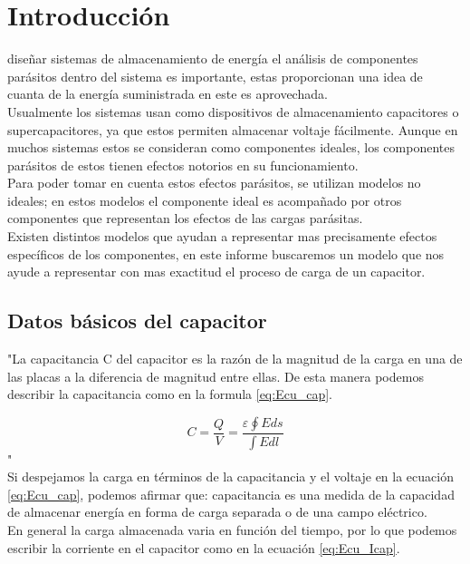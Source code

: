 \documentclass[journal]{IEEEtran}
\begin{document}
\section{Introducción}
% 
% 
% 
% 
 diseñar sistemas de almacenamiento de energía el análisis de componentes parásitos dentro del sistema es importante, estas proporcionan una idea de cuanta de la energía suministrada en este es aprovechada. \\
Usualmente los sistemas usan como dispositivos de almacenamiento capacitores o supercapacitores, ya que estos permiten almacenar voltaje fácilmente. Aunque en muchos sistemas estos se consideran como componentes ideales, los componentes parásitos de estos tienen efectos notorios en su funcionamiento.\\ Para poder tomar en cuenta estos efectos parásitos, se utilizan modelos no ideales; en estos modelos el componente ideal es acompañado por otros componentes que representan los efectos de las cargas parásitas.\\ Existen distintos modelos que ayudan a representar mas precisamente efectos específicos de los componentes, en este informe buscaremos un modelo que nos ayude a representar con mas exactitud el proceso de carga de un capacitor. 


\subsection{Datos básicos del capacitor}
"La capacitancia C del capacitor es la razón de la magnitud de la carga en una de las placas a la diferencia de magnitud entre ellas. De esta manera podemos describir la capacitancia como en la formula \ref{eq:Ecu_cap}.

\begin{equation}
\label{eq:Ecu_cap}
C=\frac{Q}{V}=\frac{\varepsilon \oint Eds}{\int Edl}
\end{equation}
"\cite{Hayt}
\\Si despejamos la carga en términos de la capacitancia y el voltaje en la ecuación \ref{eq:Ecu_cap}, podemos afirmar que: capacitancia es una medida de la capacidad de almacenar energía en forma de carga separada o de una campo eléctrico.\\ En general la carga almacenada varia en función del tiempo, por lo que podemos escribir la corriente en el capacitor como en la ecuación \ref{eq:Ecu_Icap}.
\end{document}
